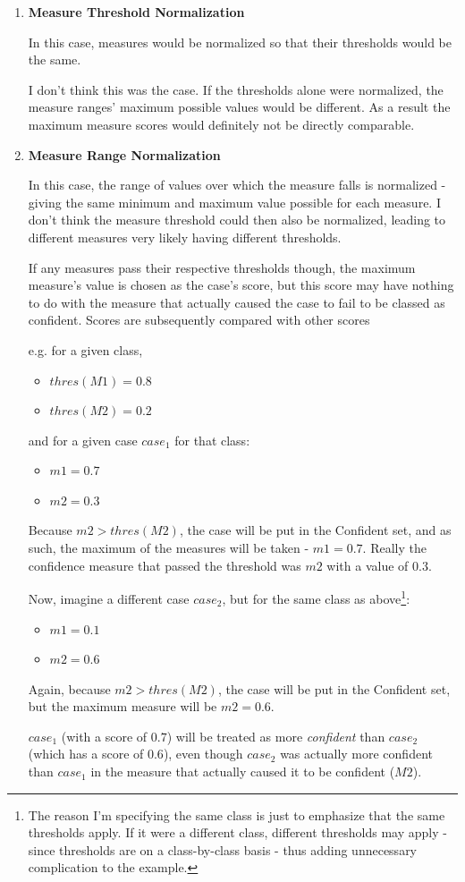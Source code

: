 \documentclass[a4paper,11pt]{report}
\begin{document}
\begin{enumerate}
	\item \textbf{Measure Threshold Normalization}
	
	In this case, measures would be normalized so that their thresholds would be the same.
	
	I don't think this was the case. If the thresholds alone were normalized, the measure ranges' maximum possible values would be different. As a result the maximum measure scores would definitely not be directly comparable.
	
	\item \textbf{Measure Range Normalization}
	
	In this case, the range of values over which the measure falls is normalized - giving the same minimum and maximum value possible for each measure. I don't think the measure threshold could then also be normalized, leading to different measures very likely having different thresholds. 
	
	If any measures pass their respective thresholds though, the maximum measure's value is chosen as the case's score, but this score may have nothing to do with the measure that actually caused the case to fail to be classed as confident. Scores are subsequently compared with other scores
	
	e.g. for a given class, 
	\begin{itemize}
		\item $thres(M1) = 0.8$
		\item $thres(M2) = 0.2$
	\end{itemize}
	and for a given case $case_{1}$ for that class:
	\begin{itemize}
		\item $m1 = 0.7$
		\item $m2 = 0.3$
	\end{itemize}  
	
	Because $m2 > thres(M2)$, the case will be put in the Confident set, and as such, the maximum of the measures will be taken - $m1=0.7$. Really the confidence measure that passed the threshold was $m2$ with a value of $0.3$.
	
	Now, imagine a different case $case_{2}$, but for the same class as above\footnote{The reason I'm specifying the same class is just to emphasize that the same thresholds apply. If it were a different class, different thresholds may apply - since thresholds are on a class-by-class basis - thus adding unnecessary complication to the example.}:
	\begin{itemize}
		\item $m1 = 0.1$
		\item $m2 = 0.6$
	\end{itemize}
	Again, because $m2 > thres(M2)$, the case will be put in the Confident set, but the maximum measure will be $m2 = 0.6$. 
	
	$case_{1}$ (with a score of $0.7$) will be treated as more \emph{confident} than $case_{2}$ (which has a score of $0.6$), even though $case_{2}$ was actually more confident than $case_{1}$ in the measure that actually caused it to be confident ($M2$).
	
\end{enumerate}
\end{document}
